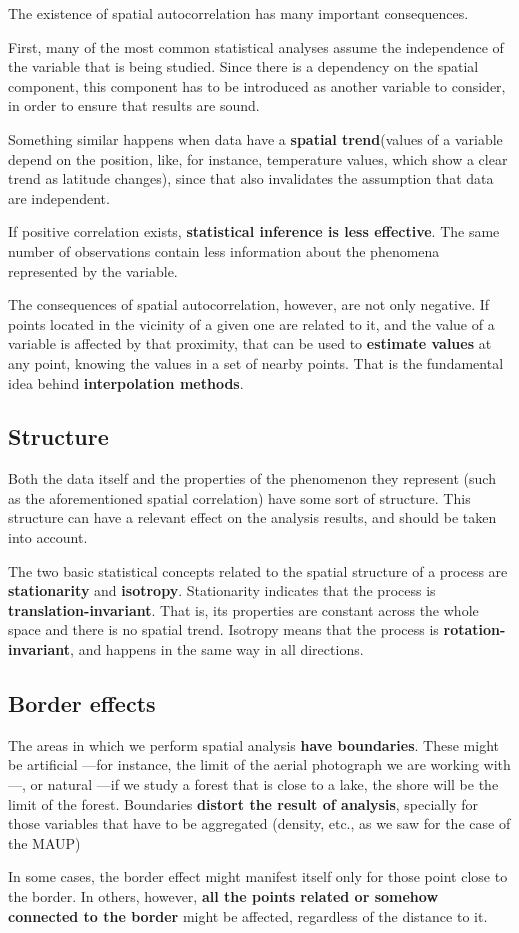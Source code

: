 The existence of spatial autocorrelation has many important consequences.

First, many of the most common statistical analyses assume the independence of the variable that is being studied. Since there is a dependency on the spatial component, this component has to be introduced as another variable to consider, in order to ensure that results are sound.


Something similar happens when data have a \textbf{spatial trend}(values of a variable depend on the position, like, for instance, temperature values, which show a clear trend as latitude changes), since that also invalidates the assumption that data are independent.

If positive correlation exists, \textbf{statistical inference is less effective}. The same number of observations contain less information about the phenomena represented by the variable.

The consequences of spatial autocorrelation, however, are not only negative. If points located in the vicinity of a given one are related to it, and the value of a variable is affected by that proximity, that can be used to \textbf{estimate values} at any point, knowing the values in a set of nearby points. That is the fundamental idea behind \textbf{interpolation methods}.


\subsection{Structure}

Both the data itself and the properties of the phenomenon they represent (such as the aforementioned spatial correlation) have some sort of structure. This structure can have a relevant effect on the analysis results, and should be taken into account.

The two basic statistical concepts related to the spatial structure of a process are \textbf{stationarity} and \textbf{isotropy}. Stationarity indicates that the process is \textbf{translation-invariant}. That is, its properties are constant across the whole space and there is no spatial trend. Isotropy means that the process is \textbf{rotation-invariant}, and happens in the same way in all directions.

\subsection{Border effects}

The areas in which we perform spatial analysis \textbf{have boundaries}. These might be artificial ---for instance, the limit of the aerial photograph we are working with---, or natural ---if we study a forest that is close to a lake, the shore will be the limit of the forest. Boundaries \textbf{distort the result of analysis}, specially for those variables that have to be aggregated (density, etc., as we saw for the case of the MAUP)

In some cases, the border effect might manifest itself only for those point close to the border. In others, however, \textbf{all the points related or somehow connected to the border} might be affected, regardless of the distance to it.

\pagestyle{empty}